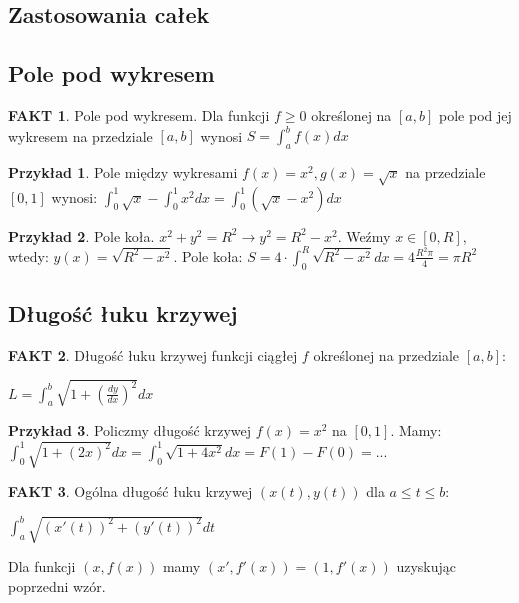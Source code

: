 \documentclass{article}
\theoremstyle{definition}
\theoremstyle{definition}
\theoremstyle{definition}
\newtheorem{pk}{Przykład}[subsection]
\theoremstyle{definition}
\newtheorem*{fakt}{FAKT}
\begin{document}
\subsection{Zastosowania całek}

\subsection{Pole pod wykresem}

\begin{fakt}
Pole pod wykresem. Dla funkcji $f\geq 0$ określonej na $[a,b]$ pole pod jej wykresem
na przedziale $[a,b]$ wynosi $S=\int_a^b f(x) dx$
\end{fakt}

\begin{pk}
    Pole między wykresami $f(x)=x^2, g(x)=\sqrt{x}$ na przedziale $[0,1]$ wynosi:
    $\int_0^1 \sqrt{x} - \int_0^1 x^2 dx = \int_0^1 (\sqrt{x}-x^2) dx$
\end{pk}

\begin{pk}
    Pole koła. $x^2+y^2=R^2\rightarrow y^2=R^2-x^2$. Weźmy $x\in[0,R]$, wtedy:
    $y(x)=\sqrt{R^2-x^2}$. Pole koła: $S=4\cdot\int_0^R \sqrt{R^2-x^2}dx=4\frac{R^2\pi}{4} = \pi R^2$
\end{pk}

\subsection{Długość łuku krzywej}

\begin{fakt}
    Długość łuku krzywej funkcji ciągłej $f$ określonej na przedziale $[a,b]$:
    \begin{center}
        $L=\int_a^b \sqrt{1+\left(\frac{dy}{dx}\right)^2} dx$
    \end{center} 
\end{fakt}

\begin{pk}
    Policzmy długość krzywej $f(x)=x^2$ na $[0,1]$. Mamy:
    $\int_0^1 \sqrt{1+(2x)^2}dx = \int_0^1 \sqrt{1+4x^2} dx = F(1)-F(0) = ...$
\end{pk}

\begin{fakt}
    Ogólna długość łuku krzywej $(x(t),y(t))$ dla $a\leq t\leq b$:
    \begin{center}
        $\int_a^b \sqrt{(x'(t))^2+(y'(t))^2} dt$
    \end{center}
    Dla funkcji $(x,f(x))$ mamy $(x',f'(x))=(1,f'(x))$ uzyskując poprzedni wzór.
\end{fakt}
\end{document}
